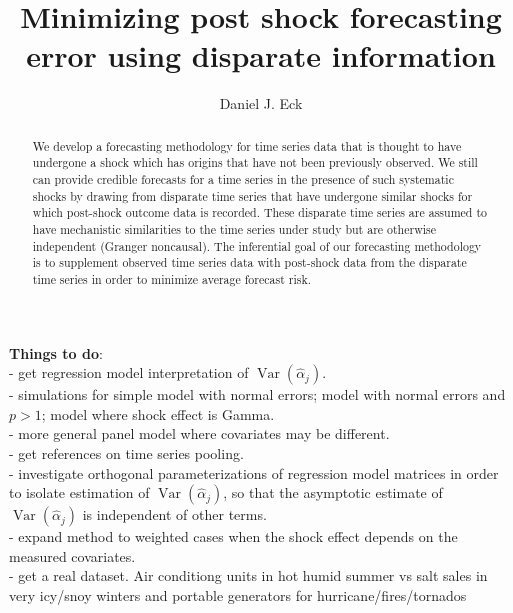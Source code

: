 \documentclass[11pt]{article}
\title{Minimizing post shock forecasting error using disparate information}
\author{Daniel J. Eck}
\DeclareMathOperator{\Var}{Var}
\begin{document}
\maketitle
\begin{abstract}
    We develop a forecasting methodology for time series data that is 
    thought to have undergone a shock which has origins that have not been 
    previously observed.  We still can provide credible forecasts for a time 
    series in the presence of such systematic shocks by drawing from disparate 
    time series that have undergone similar shocks for which post-shock 
    outcome data is recorded.  These disparate time series are assumed to have 
    mechanistic similarities to the time series under study but are otherwise 
    independent (Granger noncausal).  The inferential goal of our forecasting 
    methodology is to supplement observed time series data with post-shock 
    data from the disparate time series in order to minimize average forecast 
    risk. 
\end{abstract}


{\bf Things to do}: \\

  - get regression model interpretation of $\Var(\hat\alpha_j)$. \\

  - simulations for simple model with normal errors; model with normal 
    errors and $p > 1$; model where shock effect is Gamma. \\

  - more general panel model where covariates may be different. \\

  - get references on time series pooling. \\

  - investigate orthogonal parameterizations of regression model 
    matrices in order to isolate estimation of $\Var(\hat\alpha_j)$, 
    so that the asymptotic estimate of $\Var(\hat\alpha_j)$ is independent 
    of other terms. \\

  - expand method to weighted cases when the shock effect depends on the 
    measured covariates. \\

  - get a real dataset. Air conditiong units in hot humid summer vs salt sales 
  	in very icy/snoy winters and portable generators for hurricane/fires/tornados  \\ 
\end{document}
